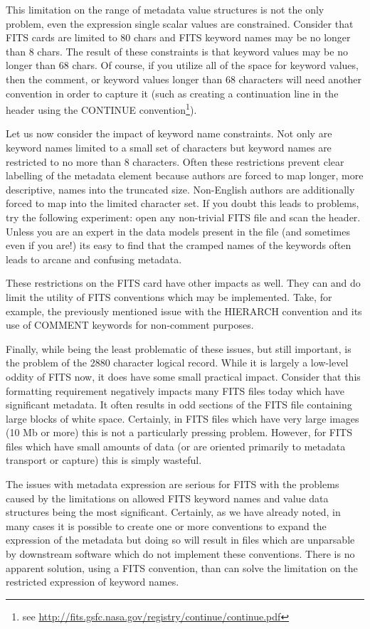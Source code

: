 \documentclass[final,authoryear,5p,times,twocolumn]{elsarticle}
\begin{document}
This limitation on the range of metadata value structures is not the
only problem, even the expression single scalar values are
constrained. Consider that FITS cards are limited to 80 chars and FITS
keyword names may be no longer than 8 chars. The result of these
constraints is that keyword values may be no longer than 68 chars. Of
course, if you utilize all of the space for keyword values, then the
comment, or keyword values longer than 68 characters will need another
convention in order to capture it (such as creating a continuation
line in the header using the CONTINUE convention\footnote{see \url{http://fits.gsfc.nasa.gov/registry/continue/continue.pdf}}).


Let us now consider the impact of keyword name constraints. Not only
are keyword names limited to a small set of characters but keyword
names are restricted to no more than 8 characters. Often these
restrictions prevent clear labelling of the metadata element because
authors are forced to map longer, more descriptive, names into the
truncated size. Non-English authors are additionally forced to map
into the limited character set. If you doubt this leads to problems,
try the following experiment: open any non-trivial FITS file and scan
the header. Unless you are an expert in the data models present in the
file (and sometimes even if you are!) its easy to find that the
cramped names of the keywords often leads to arcane and confusing
metadata.


These restrictions on the FITS card have other impacts as well. They
can and do limit the utility of FITS conventions which may be
implemented. Take, for example, the previously mentioned issue with
the HIERARCH convention and its use of COMMENT keywords for
non-comment purposes.


Finally, while being the least problematic of these issues, but still
important, is the problem of the 2880 character logical record. While
it is largely a low-level oddity of FITS now, it does have some small
practical impact. Consider that this formatting requirement negatively
impacts many FITS files today which have significant metadata. It
often results in odd sections of the FITS file containing large blocks
of white space. Certainly, in FITS files which have very large images
(10 Mb or more) this is not a particularly pressing
problem. However, for FITS files which have small amounts of data (or
are oriented primarily to metadata transport or capture) this is
simply wasteful.


The issues with metadata expression are serious for FITS with the
problems caused by the limitations on allowed FITS keyword names and
value data structures being the most significant. Certainly, as we
have already noted, in many cases it is possible to create one or more
conventions to expand the expression of the metadata but doing so will
result in files which are unparsable by downstream software which
do not implement these conventions. There is no apparent solution,
using a FITS convention, than can solve the limitation on the
restricted expression of keyword names.
\end{document}
